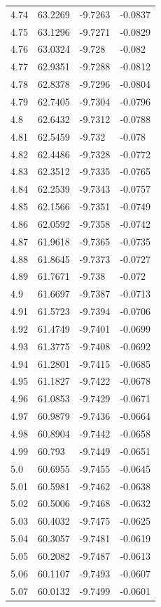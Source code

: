 \begin{tabular}{llll}
4.74 & 63.2269 & -9.7263 & -0.0837 \\
4.75 & 63.1296 & -9.7271 & -0.0829 \\
4.76 & 63.0324 & -9.728 & -0.082 \\
4.77 & 62.9351 & -9.7288 & -0.0812 \\
4.78 & 62.8378 & -9.7296 & -0.0804 \\
4.79 & 62.7405 & -9.7304 & -0.0796 \\
4.8 & 62.6432 & -9.7312 & -0.0788 \\
4.81 & 62.5459 & -9.732 & -0.078 \\
4.82 & 62.4486 & -9.7328 & -0.0772 \\
4.83 & 62.3512 & -9.7335 & -0.0765 \\
4.84 & 62.2539 & -9.7343 & -0.0757 \\
4.85 & 62.1566 & -9.7351 & -0.0749 \\
4.86 & 62.0592 & -9.7358 & -0.0742 \\
4.87 & 61.9618 & -9.7365 & -0.0735 \\
4.88 & 61.8645 & -9.7373 & -0.0727 \\
4.89 & 61.7671 & -9.738 & -0.072 \\
4.9 & 61.6697 & -9.7387 & -0.0713 \\
4.91 & 61.5723 & -9.7394 & -0.0706 \\
4.92 & 61.4749 & -9.7401 & -0.0699 \\
4.93 & 61.3775 & -9.7408 & -0.0692 \\
4.94 & 61.2801 & -9.7415 & -0.0685 \\
4.95 & 61.1827 & -9.7422 & -0.0678 \\
4.96 & 61.0853 & -9.7429 & -0.0671 \\
4.97 & 60.9879 & -9.7436 & -0.0664 \\
4.98 & 60.8904 & -9.7442 & -0.0658 \\
4.99 & 60.793 & -9.7449 & -0.0651 \\
5.0 & 60.6955 & -9.7455 & -0.0645 \\
5.01 & 60.5981 & -9.7462 & -0.0638 \\
5.02 & 60.5006 & -9.7468 & -0.0632 \\
5.03 & 60.4032 & -9.7475 & -0.0625 \\
5.04 & 60.3057 & -9.7481 & -0.0619 \\
5.05 & 60.2082 & -9.7487 & -0.0613 \\
5.06 & 60.1107 & -9.7493 & -0.0607 \\
5.07 & 60.0132 & -9.7499 & -0.0601 \\

\end{tabular}
